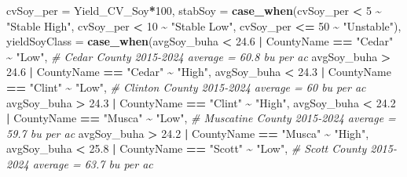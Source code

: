 \documentclass[
]{article}
\newenvironment{Shaded}{\begin{snugshade}}{\end{snugshade}}
\newcommand{\AttributeTok}[1]{\textcolor[rgb]{0.13,0.29,0.53}{#1}}
\newcommand{\CommentTok}[1]{\textcolor[rgb]{0.56,0.35,0.01}{\textit{#1}}}
\newcommand{\DecValTok}[1]{\textcolor[rgb]{0.00,0.00,0.81}{#1}}
\newcommand{\FloatTok}[1]{\textcolor[rgb]{0.00,0.00,0.81}{#1}}
\newcommand{\FunctionTok}[1]{\textcolor[rgb]{0.13,0.29,0.53}{\textbf{#1}}}
\newcommand{\NormalTok}[1]{#1}
\newcommand{\SpecialCharTok}[1]{\textcolor[rgb]{0.81,0.36,0.00}{\textbf{#1}}}
\newcommand{\StringTok}[1]{\textcolor[rgb]{0.31,0.60,0.02}{#1}}
\begin{document}
\begin{Shaded}
\begin{Highlighting}[]
         \AttributeTok{cvSoy\_per =}\NormalTok{ Yield\_CV\_Soy}\SpecialCharTok{*}\DecValTok{100}\NormalTok{,}
         \AttributeTok{stabSoy =} \FunctionTok{case\_when}\NormalTok{(cvSoy\_per }\SpecialCharTok{\textless{}} \DecValTok{5} \SpecialCharTok{\textasciitilde{}} \StringTok{"Stable High"}\NormalTok{,}
\NormalTok{                             cvSoy\_per }\SpecialCharTok{\textless{}} \DecValTok{10} \SpecialCharTok{\textasciitilde{}} \StringTok{"Stable Low"}\NormalTok{,}
\NormalTok{                             cvSoy\_per }\SpecialCharTok{\textless{}=} \DecValTok{50}  \SpecialCharTok{\textasciitilde{}} \StringTok{"Unstable"}\NormalTok{),}
         \AttributeTok{yieldSoyClass =} \FunctionTok{case\_when}\NormalTok{(avgSoy\_buha }\SpecialCharTok{\textless{}} \FloatTok{24.6} \SpecialCharTok{|}\NormalTok{ CountyName }\SpecialCharTok{==} \StringTok{"Cedar"} \SpecialCharTok{\textasciitilde{}} \StringTok{"Low"}\NormalTok{, }\CommentTok{\# Cedar County 2015{-}2024 average = 60.8 bu per ac}
\NormalTok{                                    avgSoy\_buha }\SpecialCharTok{\textgreater{}} \FloatTok{24.6} \SpecialCharTok{|}\NormalTok{ CountyName }\SpecialCharTok{==} \StringTok{"Cedar"} \SpecialCharTok{\textasciitilde{}} \StringTok{"High"}\NormalTok{,}
\NormalTok{                                    avgSoy\_buha }\SpecialCharTok{\textless{}} \FloatTok{24.3} \SpecialCharTok{|}\NormalTok{ CountyName }\SpecialCharTok{==} \StringTok{"Clint"} \SpecialCharTok{\textasciitilde{}} \StringTok{"Low"}\NormalTok{, }\CommentTok{\# Clinton County 2015{-}2024 average = 60 bu per ac}
\NormalTok{                                    avgSoy\_buha }\SpecialCharTok{\textgreater{}} \FloatTok{24.3} \SpecialCharTok{|}\NormalTok{ CountyName }\SpecialCharTok{==} \StringTok{"Clint"} \SpecialCharTok{\textasciitilde{}} \StringTok{"High"}\NormalTok{,}
\NormalTok{                                    avgSoy\_buha }\SpecialCharTok{\textless{}} \FloatTok{24.2} \SpecialCharTok{|}\NormalTok{ CountyName }\SpecialCharTok{==} \StringTok{"Musca"} \SpecialCharTok{\textasciitilde{}} \StringTok{"Low"}\NormalTok{, }\CommentTok{\# Muscatine County 2015{-}2024 average = 59.7 bu per ac}
\NormalTok{                                    avgSoy\_buha }\SpecialCharTok{\textgreater{}} \FloatTok{24.2} \SpecialCharTok{|}\NormalTok{ CountyName }\SpecialCharTok{==} \StringTok{"Musca"} \SpecialCharTok{\textasciitilde{}} \StringTok{"High"}\NormalTok{,}
\NormalTok{                                    avgSoy\_buha }\SpecialCharTok{\textless{}} \FloatTok{25.8} \SpecialCharTok{|}\NormalTok{ CountyName }\SpecialCharTok{==} \StringTok{"Scott"} \SpecialCharTok{\textasciitilde{}} \StringTok{"Low"}\NormalTok{, }\CommentTok{\# Scott County 2015{-}2024 average = 63.7 bu per ac}

\end{Highlighting}
\end{Shaded}
\end{document}
